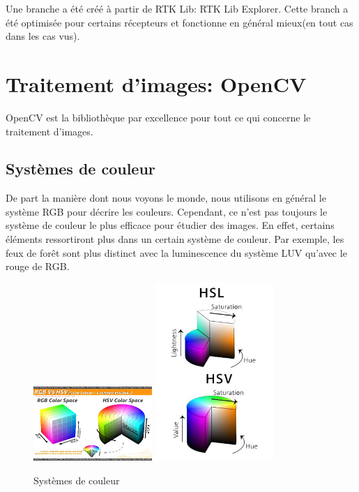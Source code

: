 \documentclass[a4paper, 11pt]{report}
\begin{document}
Une branche a été créé à partir de RTK Lib: RTK Lib Explorer. Cette branch a été optimisée pour certains récepteurs et fonctionne en général mieux(en tout cas dans les cas vus).

\chapter{Traitement d'images: OpenCV}

OpenCV est la bibliothèque par excellence pour tout ce qui concerne le traitement d'images.

\section{Systèmes de couleur}
De part la manière dont nous voyons le monde, nous utilisons en général le système RGB pour décrire les couleurs. Cependant, ce n'est pas toujours le système de couleur le plus efficace pour étudier des images. En effet, certains éléments ressortiront plus dans un certain système de couleur. Par exemple, les feux de forêt sont plus distinct avec la luminescence du système LUV qu'avec le rouge de RGB.

\begin{figure}[h!]
\begin{centering}
\includegraphics[width=0.4\textwidth]{images/RGB_HSV.jpg}
\includegraphics[width=0.4\textwidth]{images/HSL_HSV.jpg}
\caption{Systèmes de couleur}
\par\end{centering}
\end{figure}
\end{document}

